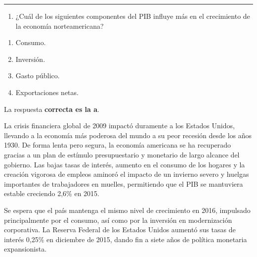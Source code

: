 \documentclass[
  letterpaper,
  DIV=11,
  numbers=noendperiod]{scrreprt}
\providecommand{\tightlist}{%
  \setlength{\itemsep}{0pt}\setlength{\parskip}{0pt}}\usepackage{longtable,booktabs,array}
\begin{document}
\begin{center}\rule{0.5\linewidth}{0.5pt}\end{center}

\begin{enumerate}
\def\labelenumi{\arabic{enumi}.}
\setcounter{enumi}{45}
\tightlist
\item
  ¿Cuál de los siguientes componentes del PIB influye más en el
  crecimiento de la economía norteamericana?
\end{enumerate}

\begin{enumerate}
\def\labelenumi{\alph{enumi})}
\item
  Consumo.
\item
  Inversión.
\item
  Gasto público.
\item
  Exportaciones netas.
\end{enumerate}

\begin{tcolorbox}[enhanced jigsaw, left=2mm, opacityback=0, colback=white, breakable, arc=.35mm, bottomrule=.15mm, rightrule=.15mm, toprule=.15mm, leftrule=.75mm, colframe=quarto-callout-tip-color-frame]
\begin{minipage}[t]{5.5mm}
\textcolor{quarto-callout-tip-color}{\faLightbulb}
\end{minipage}%
\begin{minipage}[t]{\textwidth - 5.5mm}

La respuesta \textbf{correcta es la a}.

La crisis financiera global de 2009 impactó duramente a los Estados
Unidos, llevando a la economía más poderosa del mundo a su peor recesión
desde los años 1930. De forma lenta pero segura, la economía americana
se ha recuperado gracias a un plan de estímulo presupuestario y
monetario de largo alcance del gobierno. Las bajas tasas de interés,
aumento en el consumo de los hogares y la creación vigorosa de empleos
aminoró el impacto de un invierno severo y huelgas importantes de
trabajadores en muelles, permitiendo que el PIB se mantuviera estable
creciendo 2,6\% en 2015.

Se espera que el país mantenga el mismo nivel de crecimiento en 2016,
impulsado principalmente por el consumo, así como por la inversión en
modernización corporativa. La Reserva Federal de los Estados Unidos
aumentó sus tasas de interés 0,25\% en diciembre de 2015, dando fin a
siete años de política monetaria expansionista.

\end{minipage}%
\end{tcolorbox}
\end{document}
